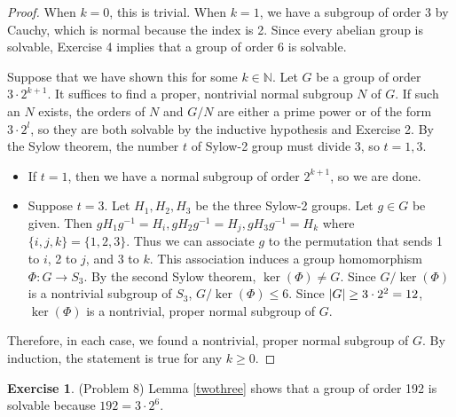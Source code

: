 \documentclass[12pt, psamsfonts]{amsart}
\theoremstyle{definition}
\newtheorem*{exer}{Exercise}
\theoremstyle{remark}
\numberwithin{equation}{section}
\begin{document}
\begin{proof}
  When $k = 0$, this is trivial.
  When $k = 1$, we have a subgroup of order 3 by Cauchy, which is normal because the index is 2.
  Since every abelian group is solvable, Exercise 4 implies that a group of order 6 is solvable.

  Suppose that we have shown this for some $k \in \mathbb{N}$.
  Let $G$ be a group of order $3 \cdot 2^{k + 1}$.
  It suffices to find a proper, nontrivial normal subgroup $N$ of $G$.
  If such an $N$ exists, the orders of $N$ and $G / N$ are either a prime power or of the form $3 \cdot 2^l$, so they are both solvable by the inductive hypothesis and Exercise 2.
  By the Sylow theorem, the number $t$ of Sylow-2 group must divide 3, so $t = 1, 3$.
  \begin{itemize}
    \item
      If $t = 1$, then we have a normal subgroup of order $2^{k + 1}$, so we are done.
    \item
      Suppose $t = 3$.
      Let $H_1, H_2, H_3$ be the three Sylow-2 groups.
      Let $g \in G$ be given.
      Then $gH_1g^{-1} = H_i, gH_2g^{-1} = H_j, gH_3g^{-1} = H_k$ where $\{ i, j, k \} = \{ 1, 2, 3 \}$.
      Thus we can associate $g$ to the permutation that sends 1 to $i$, 2 to $j$, and 3 to $k$.
      This association induces a group homomorphism $\Phi: G \rightarrow S_3$.
      By the second Sylow theorem, $\ker(\Phi) \ne G$.
      Since $G / \ker(\Phi)$ is a nontrivial subgroup of $S_3$, $G / \ker(\Phi) \leq 6$.
      Since $\abs{G} \geq 3 \cdot 2^2 = 12$, $\ker(\Phi)$ is a nontrivial, proper normal subgroup of $G$.
  \end{itemize}
  Therefore, in each case, we found a nontrivial, proper normal subgroup of $G$.
  By induction, the statement is true for any $k \geq 0$.
\end{proof}

\begin{exer}{(Problem 8)}
  Lemma \ref{twothree} shows that a group of order 192 is solvable because $192 = 3 \cdot 2^6$.
\end{exer}
\end{document}
